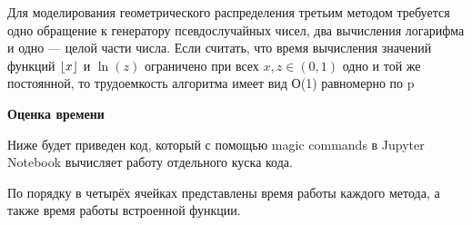 \documentclass[a4paper,12pt, oneside]{book}
\DeclarePairedDelimiter\floor{\lfloor}{\rfloor}
\begin{document}
{{\begin{center}
	\begin{minipage}[h]{0.4\linewidth}
	\end{minipage}
\end{center}



Для моделирования геометрического распределения третьим методом  требуется одно обращение к генератору псевдослучайных чисел, два вычисления логарифма и одно — целой части числа. Если считать, что время вычисления значений функций $ \floor*{x}$ и  $\ln(z)$ ограничено при всех $x, z \in (0,1)$ одно	 и той же постоянной, то трудоемкость алгоритма имеет вид О(1) равномерно по p 

\vspace{5mm}
{\large{\bf Оценка времени}}
\vspace{5mm}

Ниже будет приведен код, который с помощью magic commands в Jupyter Notebook вычисляет работу отдельного куска кода. 

По порядку в четырёх ячейках представлены время работы каждого метода, а также время работы встроенной  функции.

\vspace{5mm}
\begin{minipage}[h]{0.4\linewidth}
\end{minipage}
\vspace{5mm}

}}
\end{document}
